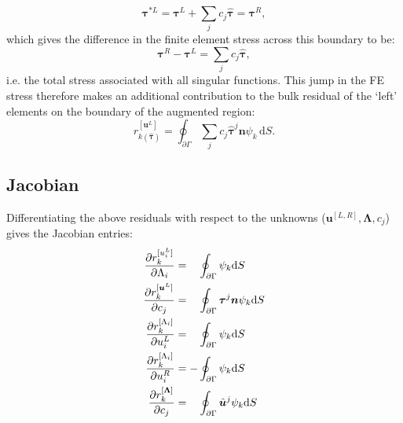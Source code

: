 \documentclass[12pt,a4paper]{article}
\numberwithin{equation}{section}
\newcommand{\D}{\mathrm{d}}
\begin{document}
\begin{equation}
  \bm{\tau}^{\bm *L} = \bm{\tau}^L + \sum_j c_j\hat{\bm{\tau}} = \bm\tau^R,
\end{equation}
which gives the difference in the finite element stress across this boundary to be:
\begin{equation}
  \bm\tau^R - \bm{\tau}^L = \sum_j c_j\hat{\bm{\tau}},
\end{equation}
i.e. the total stress associated with all singular functions. This jump in the FE stress therefore makes an additional contribution to the bulk residual of the `left' elements on the boundary of the augmented region:
\begin{equation}
  r^{[\bm u^L]}_{k(\hat{\bm\tau})} = \oint_{\partial\Gamma}\sum_jc_j\hat{\bm\tau}^j\bm n\psi_k\,\D S.
\end{equation}
\subsection{Jacobian}
Differentiating the above residuals with respect to the unknowns ($\bm u^{[L,R]},\bm\Lambda, c_j $) gives the Jacobian entries:
\begin{align}
  \frac{\partial r^{[u_i^L]}_k}{\partial\Lambda_i} &= \hphantom{-}\oint_{\partial\Gamma}\psi_k\D S \\
  \frac{\partial r^{[\bm u^L]}_k}{\partial c_j} &= \hphantom{-}\oint_{\partial\Gamma}\bm\tau^j\bm n\psi_k\D S \\
  \frac{\partial r^{[\Lambda_i]}_k}{\partial u_i^L} &= \hphantom{-}\oint_{\partial\Gamma}\psi_k\D S \\
  \frac{\partial r^{[\Lambda_i]}_k}{\partial u_i^R} &= -\oint_{\partial\Gamma}\psi_k\D S \\
  \frac{\partial r^{[\bm\Lambda]}_k}{\partial c_j} &= \hphantom{-}\oint_{\partial\Gamma}\hat{\bm u}^j\psi_k\D S \\
\end{align}

 
\end{document}
